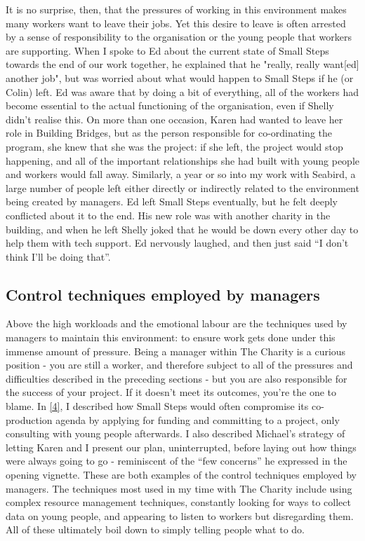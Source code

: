It is no surprise, then, that the pressures of working in this environment makes many workers want to leave their jobs. Yet this desire to leave is often arrested by a sense of responsibility to the organisation or the young people that workers are supporting. When I spoke to Ed about the current state of Small Steps towards the end of our work together, he explained that he "really, really want[ed] another job", but was worried about what would happen to Small Steps if he (or Colin) left. Ed was aware that by doing a bit of everything, all of the workers had become essential to the actual functioning of the organisation, even if Shelly didn't realise this. On more than one occasion, Karen had wanted to leave her role in Building Bridges, but as the person responsible for co-ordinating the program, she knew that she was the project: if she left, the project would stop happening, and all of the important relationships she had built with young people and workers would fall away. Similarly, a year or so into my work with Seabird, a large number of people left either directly or indirectly related to the environment being created by managers. Ed left Small Steps eventually, but he felt deeply conflicted about it to the end. His new role was with another charity in the building, and when he left Shelly joked that he would be down every other day to help them with tech support. Ed nervously laughed, and then just said “I don’t think I’ll be doing that”. 

\subsection{Control techniques employed by managers}
Above the high workloads and the emotional labour are the techniques used by managers to maintain this environment: to ensure work gets done under this immense amount of pressure.  Being a manager within The Charity is a curious position - you are still a worker, and therefore subject to all of the pressures and difficulties described in the preceding sections - but you are also responsible for the success of your project. If it doesn’t meet its outcomes, you’re the one to blame. In \ref{4}, I described how Small Steps would often compromise its co-production agenda by applying for funding and committing to a project, only consulting with young people afterwards. I also described Michael’s strategy of letting Karen and I present our plan, uninterrupted, before laying out how things were always going to go - reminiscent of the “few concerns” he expressed in the opening vignette. These are both examples of the control techniques employed by managers. The techniques most used in my time with The Charity include using complex resource management techniques, constantly looking for ways to collect data on young people, and appearing to listen to workers but disregarding them. All of these ultimately boil down to simply telling people what to do.

